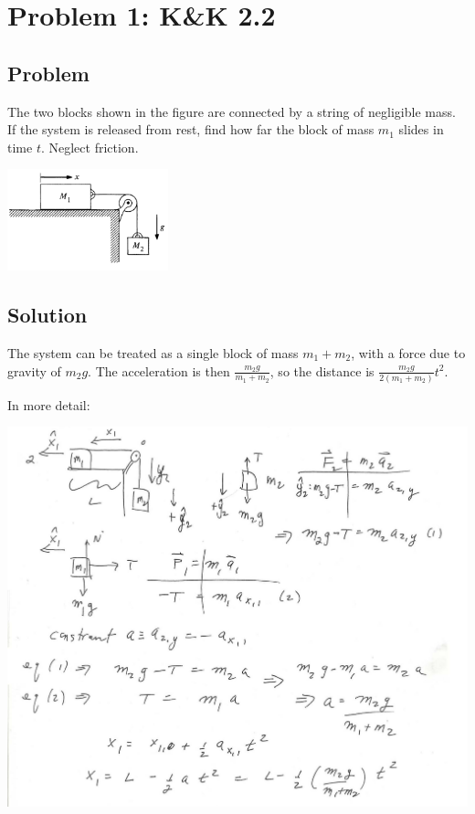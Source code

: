 \documentclass[solutions]{esg8012pset}
\date{September 17}
\begin{document}
\section*{Problem 1: K\&K 2.2}
\subsection*{Problem}
  The two blocks shown in the figure are connected by a string of negligible mass. If the system is released from rest, find how far the block of mass $m_1$ slides in time $t$. Neglect friction.
  \begin{center}\includegraphics[width=0.35\textwidth]{ps02_1}\end{center}
\subsection*{Solution}
  The system can be treated as a single block of mass $m_1 + m_2$, with a force due to gravity of $m_2 g$.  The acceleration is then $\frac{m_2 g}{m_1 + m_2}$, so the distance is $\frac{m_2 g}{2(m_1 + m_2)} t^2$.

  \noindent In more detail:
  \begin{center}\includegraphics[width=\textwidth]{ps02_Solution_Problem_1}\end{center}
\end{document}
